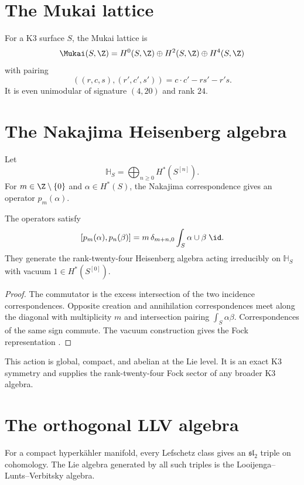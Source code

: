 \chapter{The Mukai lattice}
For a K3 surface $S$, the Mukai lattice is
\[
 \Mukai(S,\Z)=H^0(S,\Z)\oplus H^2(S,\Z)\oplus H^4(S,\Z)
\]
with pairing
\[
 ((r,c,s),(r',c',s'))=c\cdot c'-rs'-r's.
\]
It is even unimodular of signature $(4,20)$ and rank $24$.

\chapter{The Nakajima Heisenberg algebra}
Let
\[
 \mathbb H_S=\bigoplus_{n\ge0}H^*(S^{[n]}).
\]
For $m\in\Z\setminus\{0\}$ and $\alpha\in H^*(S)$, the Nakajima correspondence gives an operator $p_m(\alpha)$.

\begin{theorem}
The operators satisfy
\[
 [p_m(\alpha),p_n(\beta)]
 =m\,\delta_{m+n,0}\int_S\alpha\cup\beta\;\id.
\]
They generate the rank-twenty-four Heisenberg algebra acting irreducibly on $\mathbb H_S$ with vacuum $1\in H^*(S^{[0]})$.
\end{theorem}
\begin{proof}
The commutator is the excess intersection of the two incidence correspondences. Opposite creation and annihilation correspondences meet along the diagonal with multiplicity $m$ and intersection pairing $\int_S\alpha\beta$. Correspondences of the same sign commute. The vacuum construction gives the Fock representation \cite{Nakajima97}.
\end{proof}

This action is global, compact, and abelian at the Lie level. It is an exact K3 symmetry and supplies the rank-twenty-four Fock sector of any broader K3 algebra.

\chapter{The orthogonal LLV algebra}
For a compact hyperkähler manifold, every Lefschetz class gives an $\mathfrak{sl}_2$ triple on cohomology. The Lie algebra generated by all such triples is the Looijenga--Lunts--Verbitsky algebra.

